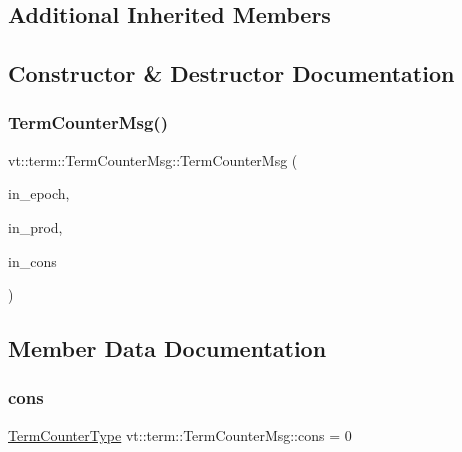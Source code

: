 \subsection*{Additional Inherited Members}


\subsection{Constructor \& Destructor Documentation}
\mbox{\label{structvt_1_1term_1_1_term_counter_msg_a5728a2f05ae6a3ccf0cac09098983b0f}} 
\subsubsection{\texorpdfstring{Term\+Counter\+Msg()}{TermCounterMsg()}}
{\footnotesize\ttfamily vt\+::term\+::\+Term\+Counter\+Msg\+::\+Term\+Counter\+Msg (\begin{DoxyParamCaption}\item[{\hyperlink{namespacevt_a985a5adf291c34a3ca263b3378388236}{Epoch\+Type} const}]{in\+\_\+epoch,  }\item[{\hyperlink{namespacevt_1_1term_a4fd378cdb0c36683afc1b3399d685f7f}{Term\+Counter\+Type} const}]{in\+\_\+prod,  }\item[{\hyperlink{namespacevt_1_1term_a4fd378cdb0c36683afc1b3399d685f7f}{Term\+Counter\+Type} const}]{in\+\_\+cons }\end{DoxyParamCaption})\hspace{0.3cm}{\ttfamily [inline]}}



\subsection{Member Data Documentation}
\mbox{\label{structvt_1_1term_1_1_term_counter_msg_a212c8487c01cd837aae027823fa32208}} 
\subsubsection{\texorpdfstring{cons}{cons}}
{\footnotesize\ttfamily \hyperlink{namespacevt_1_1term_a4fd378cdb0c36683afc1b3399d685f7f}{Term\+Counter\+Type} vt\+::term\+::\+Term\+Counter\+Msg\+::cons = 0}

